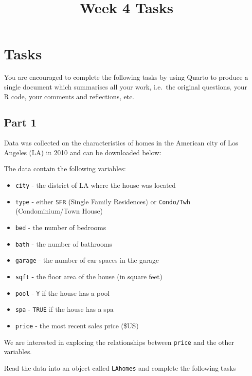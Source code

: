\documentclass[
  letterpaper,
  DIV=11,
  numbers=noendperiod]{scrartcl}
\title{Week 4 Tasks}
\author{}
\date{}
\makeatletter
\renewcommand{\maketitle}{\bgroup\setlength{\parindent}{0pt}
\begin{flushleft}
  {\color{uniblue}\sffamily\huge\textbf{\@title}} \vspace{0.3cm} \newline
  {\Large {\@subtitle}} \newline
  \@author
\end{flushleft}\egroup
}
\makeatother
\begin{document}
\maketitle

\pagestyle{mystyle}

\section{Tasks}\label{tasks}

You are encouraged to complete the following tasks by using Quarto to
produce a single document which summarises all your work, i.e.~the
original questions, your R code, your comments and reflections, etc.

\subsection{Part 1}\label{part-1}

Data was collected on the characteristics of homes in the American city
of Los Angeles (LA) in 2010 and can be downloaded below:

The data contain the following variables:

\begin{itemize}
\item
  \texttt{city} - the district of LA where the house was located
\item
  \texttt{type} - either \texttt{SFR} (Single Family Residences) or
  \texttt{Condo/Twh} (Condominium/Town House)
\item
  \texttt{bed} - the number of bedrooms
\item
  \texttt{bath} - the number of bathrooms
\item
  \texttt{garage} - the number of car spaces in the garage
\item
  \texttt{sqft} - the floor area of the house (in square feet)
\item
  \texttt{pool} - \texttt{Y} if the house has a pool
\item
  \texttt{spa} - \texttt{TRUE} if the house has a spa
\item
  \texttt{price} - the most recent sales price (\$US)
\end{itemize}

We are interested in exploring the relationships between \texttt{price}
and the other variables.

Read the data into an object called \texttt{LAhomes} and complete the
following tasks
\end{document}

